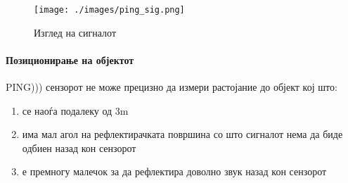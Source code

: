 \documentclass[11pt]{article}
\begin{document}
      \begin{figure}[h]
        \texttt{[image: ./images/ping\_sig.png]}
        \centering
        \caption{Изглед на сигналот}
        \label{fig:ping_sig.png}
        \end{figure}

      \begin{table}[h]
        \caption{Карактеристики на сигналот}
        \label{tab:signalchar}
        \begin{center}
          \end{center}
				\end{table}

      \paragraph{Позиционирање на објектот\\}
        PING))) сензорот не може прецизно да измери растојание до објект кој што:

      \renewcommand{\theenumi}{\alph{enumi}}
      \begin{enumerate}
        \item се наоѓа подалеку од 3m
        \item има мал агол на рефлектирачката површина со што сигналот нема да биде одбиен назад кон сензорот
        \item е премногу малечок за да рефлектира доволно звук назад кон сензорот
        \end{enumerate}
\end{document}
